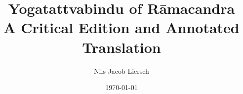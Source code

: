 

%
%
%
%
%
%
%
%
%
%
%
%



\author{Nils Jacob Liersch}
\title{Yogatattvabindu of Rāmacandra\\ A Critical Edition and Annotated Translation}
\date{\today}

\parindent=15pt

\maketitle
\clearpage
\tableofcontents
\addtocounter{page}{-1}
\thispagestyle{empty}
\clearpage


